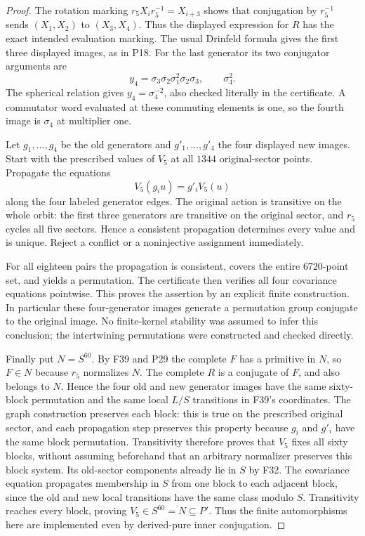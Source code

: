 \begin{proof}
The rotation marking $r_5X_ir_5^{-1}=X_{i+3}$ shows
that conjugation by $r_5^{-1}$ sends $(X_1,X_2)$ to
$(X_3,X_4)$. Thus the displayed expression for $R$
has the exact intended evaluation marking.
The usual Drinfeld formula gives the first three
displayed images, as in P18. For the last generator
its two conjugator arguments are
\[
 y_4=\sigma_3\sigma_2\sigma_1^2\sigma_2\sigma_3,
                    \qquad \sigma_4^2.
\]
The spherical relation gives $y_4=\sigma_4^{-2}$,
also checked literally in the certificate. A commutator
word evaluated at these commuting elements is one,
so the fourth image is $\sigma_4$ at multiplier one.

Let $g_1,\ldots,g_4$ be the old generators and
$g'_1,\ldots,g'_4$ the four displayed new images.
Start with the prescribed values of $V_5$ at all
$1344$ original-sector points. Propagate the equations
\[
                         V_5(g_i u)=g'_iV_5(u)
\]
along the four labeled generator edges. The original
action is transitive on the whole orbit: the first
three generators are transitive on the original
sector, and $r_5$ cycles all five sectors. Hence a
consistent propagation determines every value and
is unique. Reject a conflict or a noninjective
assignment immediately.

For all eighteen pairs the propagation is consistent,
covers the entire $6720$-point set, and yields a
permutation. The certificate then verifies all four
covariance equations pointwise. This proves the
assertion by an explicit finite construction. In
particular these four-generator images generate a
permutation group conjugate to the original image.
No finite-kernel stability was assumed to infer this
conclusion; the intertwining permutations were
constructed and checked directly.

Finally put $N=S^{60}$. By F39 and P29 the complete
$F$ has a primitive in $N$, so $F\in N$ because
$r_5$ normalizes $N$. The complete $R$ is a conjugate
of $F$, and also belongs to $N$. Hence the four old
and new generator images have the same sixty-block
permutation and the same local $L/S$ transitions in
F39's coordinates. The graph construction preserves
each block: this is true on the prescribed original
sector, and each propagation step preserves this
property because $g_i$ and $g'_i$ have the same block
permutation. Transitivity therefore proves that
$V_5$ fixes all sixty blocks, without assuming
beforehand that an arbitrary normalizer preserves
this block system.
Its old-sector components already lie in $S$ by F32.
The covariance equation propagates membership in $S$
from one block to each adjacent block, since the old
and new local transitions have the same class modulo
$S$. Transitivity reaches every block, proving
$V_5\in S^{60}=N\subseteq P'$. Thus the finite
automorphisms here are implemented even by derived-pure
inner conjugation.
\end{proof}

